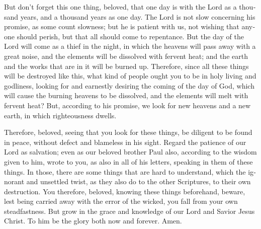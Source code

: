 \begin{paracol}{2}
\begin{otherlanguage}{english}
 But don't forget this one thing, beloved, that one day is
with the Lord as a thousand years, and a thousand years as one day.
 The Lord is not slow concerning his promise, as some
count slowness; but he is patient with us, not wishing that anyone
should perish, but that all should come to repentance. 
But the day of the Lord will come as a thief in the night, in which the
heavens will pass away with a great noise, and the elements will be
dissolved with fervent heat; and the earth and the works that are in it
will be burned up.  Therefore, since all these things
will be destroyed like this, what kind of people ought you to be in holy
living and godliness,  looking for and earnestly desiring
the coming of the day of God, which will cause the burning heavens to be
dissolved, and the elements will melt with fervent heat? 
But, according to his promise, we look for new heavens and a new earth,
in which righteousness dwells.

 Therefore, beloved, seeing that you look for these
things, be diligent to be found in peace, without defect and blameless
in his sight.  Regard the patience of our Lord as
salvation; even as our beloved brother Paul also, according to the
wisdom given to him, wrote to you,  as also in all of his
letters, speaking in them of these things. In those, there are some
things that are hard to understand, which the ignorant and unsettled
twist, as they also do to the other Scriptures, to their own
destruction.  You therefore, beloved, knowing these
things beforehand, beware, lest being carried away with the error of the
wicked, you fall from your own steadfastness.  But grow
in the grace and knowledge of our Lord and Savior Jesus Christ. To him
be the glory both now and forever. Amen. \end{otherlanguage}
\end{paracol}
